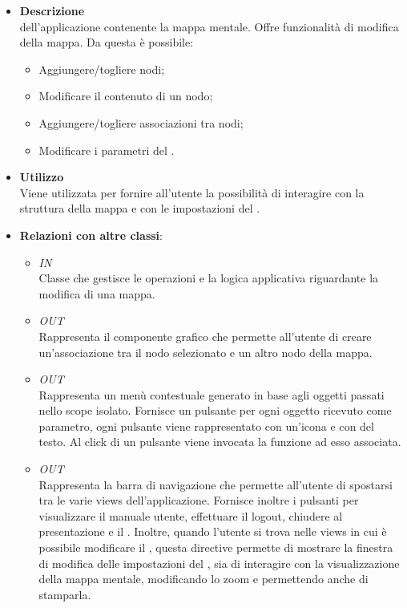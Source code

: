 \begin{itemize}
\item \textbf{Descrizione}\\
 dell’applicazione contenente la mappa mentale. Offre funzionalità di modifica della mappa.
Da questa  è possibile:
\begin{itemize}
\item Aggiungere/togliere nodi;
\item Modificare il contenuto di un nodo;
\item Aggiungere/togliere associazioni tra nodi;
\item Modificare i parametri del .
\end{itemize}
\item \textbf{Utilizzo}\\
Viene utilizzata per fornire all’utente la possibilità di interagire con la struttura della mappa e con le impostazioni del .
\item \textbf{Relazioni con altre classi}:
\begin{itemize}
\item \textit{IN} \hyperref[\nogloxy{Premi::Front-End::Controllers::MindmapEditorController}]{}\\
Classe che gestisce le operazioni e la logica applicativa riguardante la modifica di una mappa.
\item \textit{OUT} \hyperref[\nogloxy{Premi::Front-End::Directives::premiAssociationAdder}]{}\\
Rappresenta il componente grafico che permette all’utente di creare un'associazione tra il nodo selezionato e un altro nodo della mappa.
\item \textit{OUT} \hyperref[\nogloxy{Premi::Front-End::Directives::premiContextMenu}]{}\\
Rappresenta un menù contestuale generato in base agli oggetti passati nello scope isolato. Fornisce un pulsante per ogni oggetto ricevuto come parametro, ogni pulsante viene rappresentato con un'icona e con del testo. Al click di un pulsante viene invocata la funzione ad esso associata.
\item \textit{OUT} \hyperref[\nogloxy{Premi::Front-End::Directives::premiHeader}]{}\\
Rappresenta la barra di navigazione che permette all’utente di spostarsi tra le varie views dell'applicazione. Fornisce inoltre i pulsanti per visualizzare il manuale utente, effettuare il logout, chiudere al presentazione e il . Inoltre, quando l'utente si trova nelle views in cui è possibile modificare il , questa directive permette di mostrare la finestra di modifica delle impostazioni del , sia di interagire con la visualizzazione della mappa mentale, modificando lo zoom e permettendo anche di stamparla.

\end{itemize}
\end{itemize}
